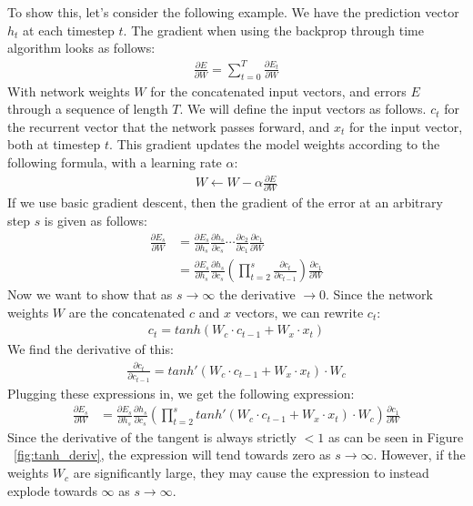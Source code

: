 To show this, let's consider the following example. We have the prediction vector $h_t$ at each timestep $t$. The gradient when using the backprop through time algorithm looks as follows:
\begin{align}
    \frac{\partial E}{\partial W} = \sum_{t=0}^{T} \frac{\partial E_t}{\partial W}
\end{align}
With network weights $W$ for the concatenated input vectors, and errors $E$ through a sequence of length $T$. We will define the input vectors as follows. $c_t$ for the recurrent vector that the network passes forward, and $x_t$ for the input vector, both at timestep $t$.
This gradient updates the model weights according to the following formula, with a learning rate $\alpha$:
\begin{align}
    W \leftarrow W - \alpha \frac{\partial E}{\partial W}
\end{align}
If we use basic gradient descent, then the gradient of the error at an arbitrary step $s$ is given as follows:
\begin{align}
    \frac{\partial E_s}{\partial W} &= \frac{\partial E_s}{\partial h_s}\frac{\partial h_s}{\partial c_s} \cdots \frac{\partial c_2}{\partial c_1} \frac{\partial c_1}{\partial W} \\
    &= \frac{\partial E_s}{\partial h_s}\frac{\partial h_s}{\partial c_s} \left(\prod_{t=2}^s\frac{\partial c_t}{\partial c_{t-1}} \right) \frac{\partial c_1} {\partial W} 
\end{align}
Now we want to show that as $s \rightarrow \infty$ the derivative $\rightarrow 0$. Since the network weights $W$ are the concatenated $c$ and $x$ vectors, we can rewrite $c_t$:
\begin{align}
    c_t = tanh(W_c \cdot c_{t-1} + W_x \cdot x_t)
\end{align}
We find the derivative of this:
\begin{align}
    \frac{\partial c_t}{\partial c_{t-1}} = tanh'(W_c \cdot c_{t-1} + W_x \cdot x_t) \cdot W_c
\end{align}
Plugging these expressions in, we get the following expression:
\begin{align}
    \frac{\partial E_s}{\partial W} &= \frac{\partial E_s}{\partial h_s}\frac{\partial h_s}{\partial c_s} \left(\prod_{t=2}^s tanh'(W_c \cdot c_{t-1} + W_x \cdot x_t) \cdot W_c \right) \frac{\partial c_1}{\partial W}
\end{align}
Since the derivative of the tangent is always strictly $<1$ as can be seen in Figure ~\ref{fig:tanh_deriv}, the expression will tend towards zero as $s \rightarrow \infty$. However, if the weights $W_c$ are significantly large, they may cause the expression to instead explode towards $\infty$ as $s \rightarrow \infty$.\\
